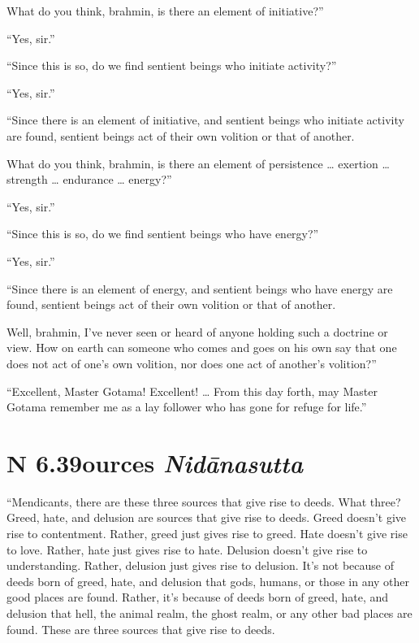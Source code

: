 \documentclass[12pt,openany]{book}%
\newcommand*{\suttatitleacronym}[1]{\smaller[2]{#1}\vspace*{.3em}}
\newcommand*{\suttatitletranslation}[1]{\linebreak{#1}}
\newcommand*{\suttatitleroot}[1]{\linebreak\smaller[2]\itshape{#1}}
\newcommand*{\tocacronym}[1]{\hspace*{-3.3em}{#1}\quad}
\newcommand*{\toctranslation}[1]{#1}
\newcommand*{\tocroot}[1]{(\textit{#1})}
\begin{document}
What do you think, brahmin, is there an element of initiative?” 

“Yes, sir.” 

“Since this is so, do we find sentient beings who initiate activity?” 

“Yes, sir.” 

“Since there is an element of initiative, and sentient beings who initiate activity are found, sentient beings act of their own volition or that of another. 

What do you think, brahmin, is there an element of persistence … exertion … strength … endurance … energy?” 

“Yes, sir.” 

“Since this is so, do we find sentient beings who have energy?” 

“Yes, sir.” 

“Since there is an element of energy, and sentient beings who have energy are found, sentient beings act of their own volition or that of another. 

Well, brahmin, I’ve never seen or heard of anyone holding such a doctrine or view. How on earth can someone who comes and goes on his own say that one does not act of one’s own volition, nor does one act of another’s volition?” 

“Excellent, Master Gotama! Excellent! … From this day forth, may Master Gotama remember me as a lay follower who has gone for refuge for life.” 

%
\section*{{\suttatitleacronym AN 6.39}{\suttatitletranslation Sources }{\suttatitleroot Nidānasutta}}
\addcontentsline{toc}{section}{\tocacronym{AN 6.39} \toctranslation{Sources } \tocroot{Nidānasutta}}

“Mendicants, there are these three sources that give rise to deeds. What three? Greed, hate, and delusion are sources that give rise to deeds. Greed doesn’t give rise to contentment. Rather, greed just gives rise to greed. Hate doesn’t give rise to love. Rather, hate just gives rise to hate. Delusion doesn’t give rise to understanding. Rather, delusion just gives rise to delusion. It’s not because of deeds born of greed, hate, and delusion that gods, humans, or those in any other good places are found. Rather, it’s because of deeds born of greed, hate, and delusion that hell, the animal realm, the ghost realm, or any other bad places are found. These are three sources that give rise to deeds. 
\end{document}
